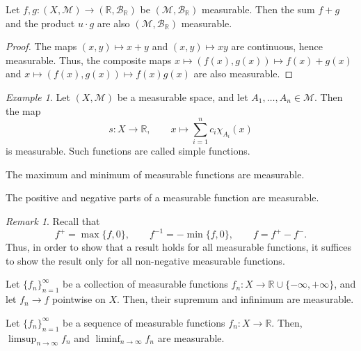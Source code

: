 \documentclass[11pt]{article}
\newcommand{\R}{\mathbb{R}}
\newcommand{\M}{\mathcal{M}}
\theoremstyle{definition}
\theoremstyle{remark}
\newtheorem*{remark}{Remark}
\newtheorem*{example}{Example}
\numberwithin{equation}{section}
\begin{document}
    \begin{corollary}
        Let $f, g\colon (X, \M) \to (\R, \mathcal{B}_\R)$ be $(\M, \mathcal{B}_\R)$
        measurable. Then the sum $f + g$ and the product $u\cdot g$ are also $(\M,
        \mathcal{B}_\R)$ measurable.
    \end{corollary}
    \begin{proof}
        The maps $(x, y) \mapsto x + y$ and $(x, y) \mapsto xy$ are continuous, hence
        measurable. Thus, the composite maps $x \mapsto (f(x), g(x)) \mapsto f(x) +
        g(x)$ and $x \mapsto (f(x), g(x)) \mapsto f(x)g(x)$ are also measurable.
    \end{proof}

    \begin{example}
        Let $(X, \M)$ be a measurable space, and let $A_1, \dots, A_n \in \M$. Then
        the map \[
            s\colon X \to \R, \qquad x \mapsto \sum_{i = 1}^n c_i \chi_{A_i}(x)
        \] is measurable. Such functions are called simple functions.
    \end{example}
    
    \begin{lemma}
        The maximum and minimum of measurable functions are measurable.
    \end{lemma}
    \begin{corollary}
        The positive and negative parts of a measurable function are measurable.
        \begin{remark}
            Recall that \[
                f^+ = \max\{f, 0\}, \qquad f^{-1} = -\min\{f, 0\}, \qquad f = f^+ -
                f^-.
            \] Thus, in order to show that a result holds for all measurable
            functions, it suffices to show the result only for all non-negative
            measurable functions.
        \end{remark}
    \end{corollary}
    

    \begin{theorem}
        Let $\{f_n\}_{n = 1}^\infty$ be a collection of measurable functions
        $f_n\colon X \to \R \cup \{-\infty, +\infty\}$, and let $f_n \to f$ pointwise
        on $X$.  Then, their supremum and infinimum are measurable.
    \end{theorem}
    
    \begin{theorem}
        Let $\{f_n\}_{n = 1}^\infty$ be a sequence of measurable functions $f_n\colon
        X \to \R$. Then, $\limsup_{n \to \infty} f_n$ and $\liminf_{n \to \infty}
        f_n$ are measurable.
    \end{theorem}
    
\end{document}
